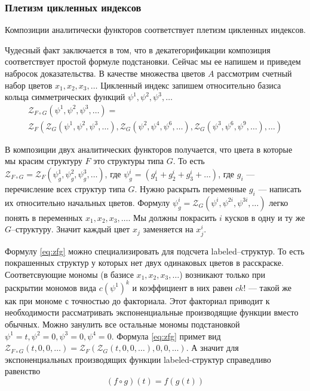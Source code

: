 \subsubsection{Плетизм цикленных индексов}
\begin{theorem}
Композиции аналитически функторов соответствует плетизм цикленных
индексов.
\end{theorem}
Чудесный факт заключается в том, что в декатегорификации
композиция соответствует простой формуле подстановки. Сейчас мы ее напишем и
приведем набросок доказательства. В качестве множества цветов $A$ рассмотрим
счетный набор цветов $x_1, x_2, x_3, \dots$ Цикленный индекс запишем
относительно базиса кольца симметрических функций $\psi^1, \psi^2, \psi^3, \dots$
\begin{multline}
\label{eq:zfg}
	\mathcal Z_{F \circ G} (\psi^1, \psi^2, \psi^3, \dots) = \\
	\mathcal Z_F(
		\mathcal Z_G(\psi^1, \psi^2, \psi^3, \dots),
		\mathcal Z_G(\psi^2, \psi^4, \psi^6, \dots),
		\mathcal Z_G(\psi^3, \psi^6, \psi^9, \dots),
		\dots
	)
\end{multline}

В композиции двух аналитических функторов получается, что цвета в которые мы
красим структуру $F$ это структуры типа $G$. То есть $\mathcal Z_{F \circ G} =
\mathcal Z_F(\psi_g^1, \psi_g^2, \psi_g^3, \dots)$, где $\psi_g^i = (g_1^i +
g_2^i + g_3^i + \dots)$, где $g_i$ --- перечисление всех структур типа $G$.
Нужно раскрыть переменные $g_i $ --- написать их относительно начальных цветов.
Формулу $\psi_g^i = \mathcal Z_G(\psi^i, \psi^{2i}, \psi^{3i}, \dots)$ легко
понять в переменных $x_1, x_2, x_3, \dots$. Мы должны покрасить $i$ кусков в
одну и ту же $G$--структуру. Значит каждый цвет $x_j$ заменяется на $x_j^i$.

\begin{remark}
Формулу \ref{eq:zfg} можно специализировать для подсчета labeled--структур. То
есть покрашенных структур у которых нет двух одинаковых цветов в расскраске.
Соответсвующие мономы (в базисе $x_1, x_2, x_3, \dots$) возникают только при
раскрытии мономов вида $c(\psi^1)^k$ и коэффициент в них равен $ck!$ --- такой
же как при мономе с точностью до факториала. Этот факториал приводит к
необходимости рассматривать экспоненциальные производящие функции вместо
обычных. Можно занулить все остальные мономы подстановкой $\psi^1 = t, \psi^2 =
0, \psi^3 = 0, \psi^4 = 0$. Формула \ref{eq:zfg} примет вид $
\mathcal Z_{F \circ G} (t, 0, 0, \dots) =
	\mathcal Z_F(
		\mathcal Z_G(t, 0, 0, \dots), 0, 0, \dots
	)
$.
А значит для экспоненциальных производящих функции labeled-структур справедливо
равенство
\begin{equation}
\label{eq:comp}
(f \circ g) (t) = f(g(t))
\end{equation}
\end{remark}

